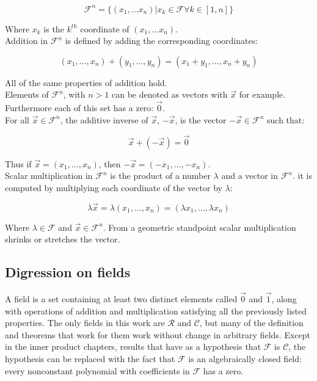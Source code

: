   $$\mathcal{F}^n = \{(x_1, \dots x_n) | x_k\in\mathcal{F}\forall k \in [1,n]\}$$

  Where $x_k$ is the $k^{th}$ coordinate of $(x_1, \dots x_n)$.\\

  Addition in $\mathcal{F}^n$ is defined by adding the corresponding coordinates:

  $$(x_1,\dots, x_n) + (y_1, \dots, y_n) = (x_1 + y_1, \dots, x_n+y_n)$$

  All of the same properties of addition hold.\\

  Elements of $\mathcal{F}^n$, with $n > 1$ can be denoted as vectors with $\vec{x}$ for example.
  Furthermore each of this set has a zero: $\vec{0}$.\\

  For all $\vec{x}\in\mathcal{F}^n$, the additive inverse of $\vec{x}$, $-\vec{x}$, is the vector $-\vec{x}\in\mathcal{F}^n$ such that:

  $$\vec{x} + (-\vec{x}) = \vec{0}$$

  Thus if $\vec{x} = (x_1, \dots, x_n)$, then $-\vec{x} = (-x_1, \dots, -x_n)$.\\

  Scalar multiplication in $\mathcal{F}^n$ is the product of a number $\lambda$ and a vector in $\mathcal{F}^n$.
  it is computed by multiplying each coordinate of the vector by $\lambda$:

  $$\lambda\vec{x} = \lambda(x_1,\dots, x_n) = (\lambda x_1, \dots, \lambda x_n)$$

  Where $\lambda\in\mathcal{F}$ and $\vec{x}\in\mathcal{F}^n$.
  From a geometric standpoint scalar multiplication shrinks or stretches the vector.

  \subsection{Digression on fields}
  A field is a set containing at least two distinct elements called $\vec{0}$ and $\vec{1}$, along with operations of addition and multiplication satisfying all the previously listed properties.
  The only fields in this work are $\mathcal{R}$ and $\mathcal{C}$, but many of the definition and theorems that work for them work without change in arbitrary fields.
  Except in the inner product chapters, results that have as a hypothesis that $\mathcal{F}$ is $\mathcal{C}$, the hypothesis can be replaced with the fact that $\mathcal{F}$ is an algebraically closed field: every nonconstant polynomial with coefficients in $\mathcal{F}$ has a zero.
